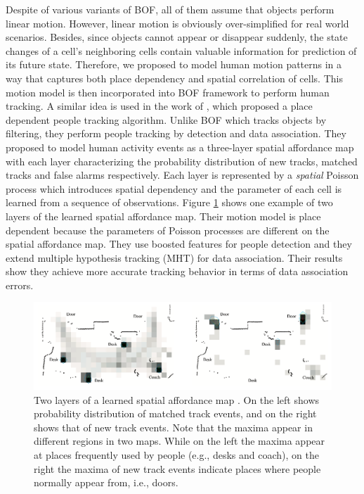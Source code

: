 Despite of various variants of BOF, all of them assume that objects perform linear motion. However, linear motion is obviously over-simplified for real world scenarios. Besides, since objects cannot appear or disappear suddenly, the state changes of a cell's neighboring cells contain valuable information for prediction of its future state. Therefore, we proposed to model human motion patterns in a way that captures both place dependency and spatial correlation of cells. This motion model is then incorporated into BOF framework to perform human tracking. A similar idea is used in the work of \citet{luber2011place}, which proposed a place dependent people tracking algorithm. Unlike BOF which tracks objects by filtering, they perform people tracking by detection and data association. They proposed to model human activity events as a three-layer spatial affordance map with each layer characterizing the probability distribution of new tracks, matched tracks and false alarms respectively. Each layer is represented by a \textit{spatial} Poisson process which introduces spatial dependency and the parameter of each cell is learned from a sequence of observations. Figure \ref{fig:affordance} shows one example of two layers of the learned spatial affordance map. Their motion model is place dependent because the parameters of Poisson processes are different on the spatial affordance map. They use boosted features for people detection \citep{arras2007using} and they extend multiple hypothesis tracking (MHT) for data association. Their results show they achieve more accurate tracking behavior in terms of data association errors. 

\begin{figure}[H]
  \centering
    \includegraphics[width=\textwidth]{figures/affordance_map.png}
    \caption[Two layers of a spatial affordance map.]{Two layers of a learned spatial affordance map \citep{luber2011place}. On the left shows probability distribution of matched track events, and on the right shows that of new track events. Note that the maxima appear in different regions in two maps. While on the left the maxima appear at places frequently used by people (e.g., desks and coach), on the right the maxima of new track events indicate places where people normally appear from, i.e., doors.}
    \label{fig:affordance}
\end{figure}

